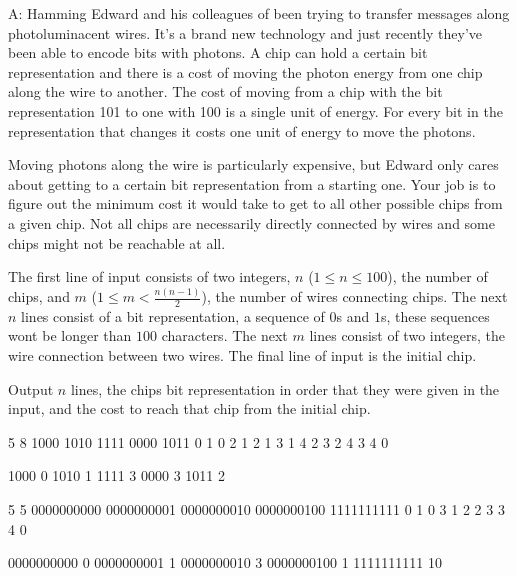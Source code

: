 \begin{problem}{A: Hamming}
Edward and his colleagues of been trying to transfer messages along photoluminacent wires.
It's a brand new technology and just recently they've been able to encode bits with photons.
A chip can hold a certain bit representation and there is a cost of moving the photon energy from one chip along the wire to another.
The cost of moving from a chip with the bit representation 101 to one with 100 is a single unit of energy.
For every bit in the representation that changes it costs one unit of energy to move the photons.

Moving photons along the wire is particularly expensive, but Edward only cares about getting to a certain bit representation from a starting one.
Your job is to figure out the minimum cost it would take to get to all other possible chips from a given chip.
Not all chips are necessarily directly connected by wires and some chips might not be reachable at all.
\end{problem}

\begin{formalin}
The first line of input consists of two integers, $n$ ($1 \leq n \leq 100$), the number of chips, and $m$ ($1 \leq m < \frac{n(n-1)}{2}$), the number of wires connecting chips.
The next $n$ lines consist of a bit representation, a sequence of $0$s and $1$s, these sequences wont be longer than $100$ characters.
The next $m$ lines consist of two integers, the wire connection between two wires.
The final line of input is the initial chip.
\end{formalin}

\begin{formalout}
Output $n$ lines, the chips bit representation in order that they were given in the input, and the cost to reach that chip from the initial chip.
\end{formalout}

\begin{datain}
5 8
1000
1010
1111
0000
1011
0 1
0 2
1 2
1 3
1 4
2 3
2 4
3 4
0
\end{datain}
\begin{dataout}
1000 0
1010 1
1111 3
0000 3
1011 2
\end{dataout}

\begin{datain}
5 5
0000000000
0000000001
0000000010
0000000100
1111111111
0 1
0 3
1 2
2 3
3 4
0
\end{datain}
\begin{dataout}
0000000000 0
0000000001 1
0000000010 3
0000000100 1
1111111111 10
\end{dataout}

